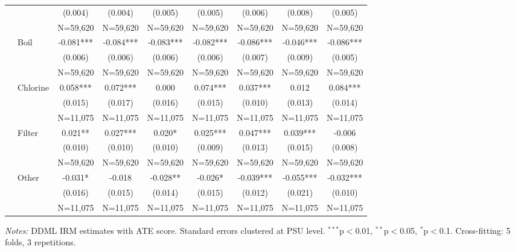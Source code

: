 \begin{table}[htbp]
{\begin{tabular}{llccccccc}
 &  & (0.004) & (0.004) & (0.005) & (0.005) & (0.006) & (0.008) & (0.005) \\
 &  & {N=59,620} & {N=59,620} & {N=59,620} & {N=59,620} & {N=59,620} & {N=59,620} & {N=59,620} \\
\addlinespace
 & Boil & -0.081*** & -0.084*** & -0.083*** & -0.082*** & -0.086*** & -0.046*** & -0.086*** \\
 &  & (0.006) & (0.006) & (0.006) & (0.006) & (0.007) & (0.009) & (0.005) \\
 &  & {N=59,620} & {N=59,620} & {N=59,620} & {N=59,620} & {N=59,620} & {N=59,620} & {N=59,620} \\
\addlinespace
 & Chlorine & 0.058*** & 0.072*** & 0.000 & 0.074*** & 0.037*** & 0.012 & 0.084*** \\
 &  & (0.015) & (0.017) & (0.016) & (0.015) & (0.010) & (0.013) & (0.014) \\
 &  & {N=11,075} & {N=11,075} & {N=11,075} & {N=11,075} & {N=11,075} & {N=11,075} & {N=11,075} \\
\addlinespace
 & Filter & 0.021** & 0.027*** & 0.020* & 0.025*** & 0.047*** & 0.039*** & -0.006 \\
 &  & (0.010) & (0.010) & (0.010) & (0.009) & (0.013) & (0.015) & (0.008) \\
 &  & {N=59,620} & {N=59,620} & {N=59,620} & {N=59,620} & {N=59,620} & {N=59,620} & {N=59,620} \\
\addlinespace
 & Other & -0.031* & -0.018 & -0.028** & -0.026* & -0.039*** & -0.055*** & -0.032*** \\
 &  & (0.016) & (0.015) & (0.014) & (0.015) & (0.012) & (0.021) & (0.010) \\
 &  & {N=11,075} & {N=11,075} & {N=11,075} & {N=11,075} & {N=11,075} & {N=11,075} & {N=11,075} \\
\hline\hline
\end{tabular}}
\begin{minipage}{\textwidth}
\footnotesize
\textit{Notes:} DDML IRM estimates with ATE score. 
Standard errors clustered at PSU level. 
$^{***}$p$<$0.01, $^{**}$p$<$0.05, $^{*}$p$<$0.1. 
Cross-fitting: 5 folds, 3 repetitions. 
\end{minipage}
\end{table}